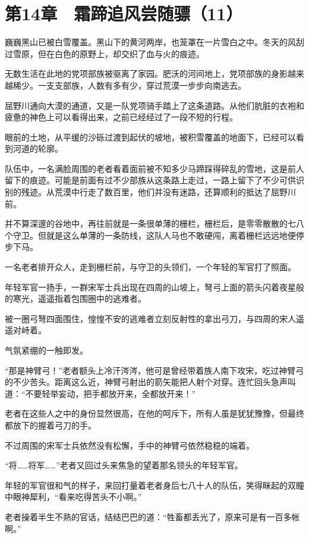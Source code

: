 \section{第14章　霜蹄追风尝随骠（11）}

巍巍黑山已被白雪覆盖。黑山下的黄河两岸，也笼罩在一片雪白之中。冬天的风刮过雪原，但在白色的原野上，却交织了血与火的痕迹。

无数生活在此地的党项部族被驱离了家园。肥沃的河间地上，党项部族的身影越来越稀少。一支支部族，人数有多有少，穿过荒漠一步步向南逃去。

屈野川通向大漠的通道，又是一队党项骑手踏上了这条道路。从他们肮脏的衣袍和疲惫的神色上可以看得出来，之前已经经过了一段不短的行程。

眼前的土地，从平缓的沙砾过渡到起伏的坡地，被积雪覆盖的地面下，已经可以看到河道的轮廓。

队伍中，一名满脸周围的老者看着面前被不知多少马蹄踩得碎乱的雪地，这是前人留下的痕迹。可能是前面有过不少部族从这条路上走过，一路上留下了不少可供识别的残迹。从荒漠中行走了数百里，他们并没有迷路，还算顺利的抵达了屈野川前。

并不算深邃的谷地中，再往前就是一条很单薄的栅栏，栅栏后，是零零散散的七八个守卫。但就是这么单薄的一条防线，这队人马也不敢硬闯，离着栅栏远远地便停步下马。

一名老者排开众人，走到栅栏前，与守卫的头领们，一个年轻的军官打了照面。

年轻军官一扬手，一群宋军士兵出现在四周的山坡上，弩弓上面的箭头闪着夜星般的寒光，遥遥指着包围圈中的逃难者。

被一圈弓弩四面围住，惶惶不安的逃难者立刻反射性的拿出弓刀，与四周的宋人遥遥对峙着。

气氛紧绷的一触即发。

“那是神臂弓！”老者额头上冷汗涔涔，他可是曾经带着族人南下攻宋，吃过神臂弓的不少苦头。距离这么近，神臂弓射出的箭矢能把人射个对穿。连忙回头急声叫道：“不要轻举妄动，把手都放开来，全都放开来！”

老者在这些人之中的身份显然很高，在他的呵斥下，所有人虽是犹犹豫豫，但最终都放下的握着弓刀的手。

不过周围的宋军士兵依然没有松懈，手中的神臂弓依然稳稳的端着。

“将……将军……”老者又回过头来焦急的望着那名领头的年轻军官。

年轻的军官很和气的样子，来回打量着老者身后七八十人的队伍，笑得眯起的双瞳中眼神犀利，“看来吃得苦头不小啊。”

老者操着半生不熟的官话，结结巴巴的道：“牲畜都丢光了，原来可是有一百多帐啊。”

